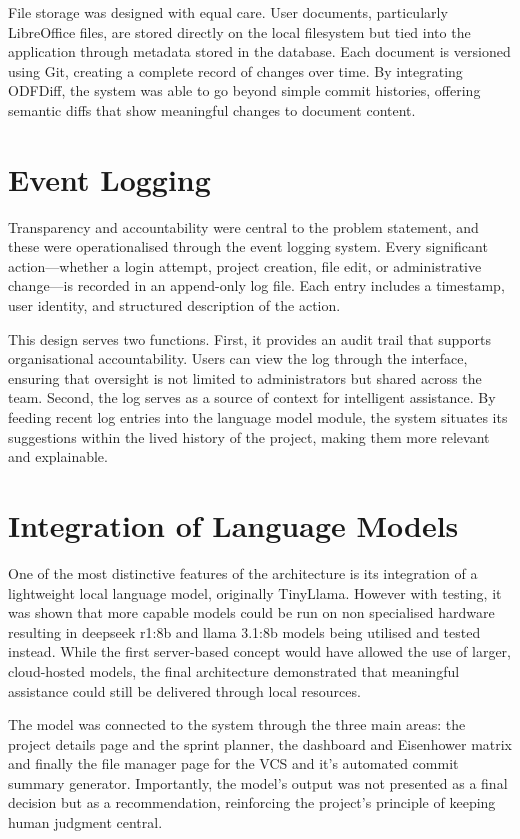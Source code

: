 \documentclass{report}
\begin{document}
File storage was designed with equal care. 
User documents, particularly LibreOffice files, are stored directly on the local filesystem but tied into the application through metadata stored in the database. 
Each document is versioned using Git, creating a complete record of changes over time. 
By integrating ODFDiff, the system was able to go beyond simple commit histories, offering semantic diffs that show meaningful changes to document content.


\section{Event Logging}

Transparency and accountability were central to the problem statement, and these were operationalised through the event logging system. 
Every significant action—whether a login attempt, project creation, file edit, or administrative change—is recorded in an append-only log file. 
Each entry includes a timestamp, user identity, and structured description of the action.

This design serves two functions. 
First, it provides an audit trail that supports organisational accountability. 
Users can view the log through the interface, ensuring that oversight is not limited to administrators but shared across the team. 
Second, the log serves as a source of context for intelligent assistance. 
By feeding recent log entries into the language model module, the system situates its suggestions within the lived history of the project, making them more relevant and explainable.

\section{Integration of Language Models}

One of the most distinctive features of the architecture is its integration of a lightweight local language model, originally TinyLlama.
However with testing, it was shown that more capable models could be run on non specialised hardware resulting in deepseek r1:8b and llama 3.1:8b models being utilised and tested instead.
While the first server-based concept would have allowed the use of larger, cloud-hosted models, the final architecture demonstrated that meaningful assistance could still be delivered through local resources.

The model was connected to the system through the three main areas: the project details page and the sprint planner, the dashboard and Eisenhower matrix and finally the file manager page for the VCS and it's automated commit summary generator. 
Importantly, the model's output was not presented as a final decision but as a recommendation, reinforcing the project's principle of keeping human judgment central.
\end{document}
